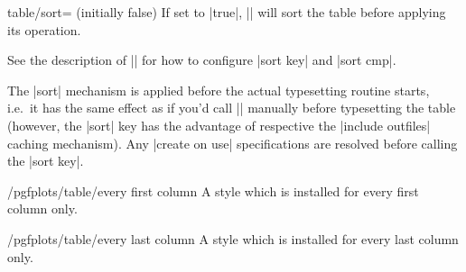 \begin{pgfplotskey}{table/sort= (initially false)}
	If set to |true|, |\pgfplotstabletypeset| will sort the table before applying its operation.

	See the description of |\pgfplotstablesort| for how to configure |sort key| and |sort cmp|.

\begin{codeexample}[]
\end{codeexample}

	The |sort| mechanism is applied before the actual typesetting routine starts, i.e.\ it has the same effect as if you'd call |\pgfplotstablesort| manually before typesetting the table (however, the |sort| key has the advantage of respective the |include outfiles| caching mechanism). Any |create on use| specifications are resolved before calling the |sort key|.


\end{pgfplotskey}

\begin{stylekey}{/pgfplots/table/every first column}
A style which is installed for every first column only.
\begin{codeexample}[narrow]
\end{codeexample}
\end{stylekey}

\begin{stylekey}{/pgfplots/table/every last column}
A style which is installed for every last column only.
\end{stylekey}

